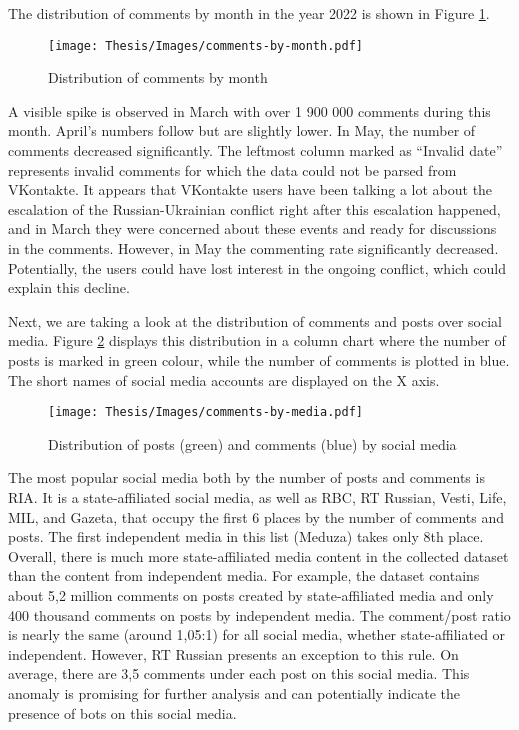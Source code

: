 The distribution of comments by month in the year 2022 is shown in Figure \ref{fig:comments-by-month}.

\begin{figure}
	\centering
	\texttt{[image: Thesis/Images/comments-by-month.pdf]}
	\caption{Distribution of comments by month }
	\label{fig:comments-by-month}
\end{figure}

A visible spike is observed in March with over 1 900 000 comments during this month. April’s numbers follow but are slightly lower. In May, the number of comments decreased significantly. The leftmost column marked as ``Invalid date'' represents invalid comments for which the data could not be parsed from VKontakte. It appears that VKontakte users have been talking a lot about the escalation of the Russian-Ukrainian conflict right after this escalation happened, and in March they were concerned about these events and ready for discussions in the comments. However, in May the commenting rate significantly decreased. Potentially, the users could have lost interest in the ongoing conflict, which could explain this decline.

Next, we are taking a look at the distribution of comments and posts over social media. Figure \ref{fig:posts-comments-by-media} displays this distribution in a column chart where the number of posts is marked in green colour, while the number of comments is plotted in blue. The short names of social media accounts are displayed on the X axis.

\begin{figure}
	\centering
	\texttt{[image: Thesis/Images/comments-by-media.pdf]}
	\caption{Distribution of posts (green) and comments (blue) by social media}
	\label{fig:posts-comments-by-media}
\end{figure}

The most popular social media both by the number of posts and comments is RIA. It is a state-affiliated social media, as well as RBC, RT Russian, Vesti, Life, MIL, and Gazeta, that occupy the first 6 places by the number of comments and posts. The first independent media in this list (Meduza) takes only 8th place. Overall, there is much more state-affiliated media content in the collected dataset than the content from independent media. For example, the dataset contains about 5,2 million comments on posts created by state-affiliated media and only 400 thousand comments on posts by independent media. The comment/post ratio is nearly the same (around 1,05:1) for all social media, whether state-affiliated or independent. However, RT Russian presents an exception to this rule. On average, there are 3,5 comments under each post on this social media. This anomaly is promising for further analysis and can potentially indicate the presence of bots on this social media.


